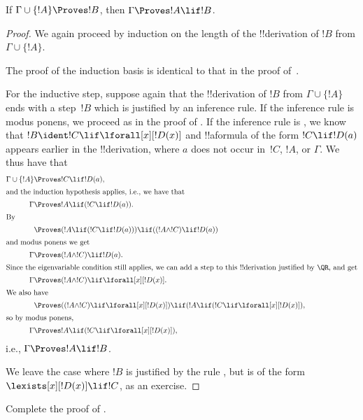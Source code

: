 \documentclass[../../../include/open-logic-section]{subfiles}
\begin{document}


\begin{thm}
 If $\Gamma \cup \{!A\} \Proves !B$,
then $\Gamma \Proves !A \lif !B$.
\end{thm}

\begin{proof}
We again proceed by induction on the length
of the !!{derivation} of $!B$ from $\Gamma \cup \{!A\}$.

The proof of the induction basis is identical to that in the proof
of~.

For the inductive step, suppose again that the !!{derivation} of $!B$
from $\Gamma \cup \{!A\}$ ends with a step~$!B$ which is justified by
an inference rule. If the inference rule is modus ponens, we proceed
as in the proof of . If the inference
rule is \QR, we know that $!B \ident !C \lif \lforall[x][!D(x)]$ and
!!a{formula} of the form $!C \lif !D(a)$ appears earlier in the
!!{derivation}, where $a$ does not occur in~$!C$, $!A$, or $\Gamma$. We
thus have that
\begin{align*}
  \Gamma \cup \{!A\} & \Proves !C \lif !D(a),\\
  \intertext{and the induction hypothesis applies, i.e., we have that}
    \Gamma & \Proves !A \lif (!C \lif !D(a)).\\
  \intertext{By}
  & \Proves (!A \lif (!C \lif !D(a))) \lif ((!A \land !C) \lif !D(a))\\
  \intertext{and modus ponens we get}
  \Gamma & \Proves (!A \land !C) \lif !D(a).\\
  \intertext{Since the eigenvariable condition still applies, we can add a step to this !!{derivation} justified by \QR, and get}
    \Gamma & \Proves (!A \land !C) \lif \lforall[x][!D(x)].\\
    \intertext{We also have}
    & \Proves ((!A \land !C) \lif \lforall[x][!D(x)]) \lif (!A \lif (!C \lif \lforall[x][!D(x)]),\\
    \intertext{so by modus ponens,}
    \Gamma & \Proves !A \lif (!C \lif \lforall[x][!D(x)]),
\end{align*}
i.e., $\Gamma \Proves !A \lif !B$.

We leave the case where $!B$ is justified by the rule \QR, but is of
the form $\lexists[x][!D(x)] \lif !C$, as an exercise.
\end{proof}

\begin{prob}
  Complete the proof of .
\end{prob}
\end{document}
